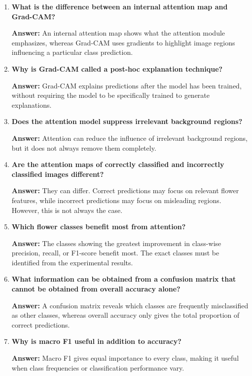 \documentclass[10pt]{article}
\begin{document}
\begin{enumerate}
\item \textbf{What is the difference between an internal attention map and Grad-CAM?}

\textbf{Answer:} An internal attention map shows what the attention module emphasizes, whereas Grad-CAM uses gradients to highlight image regions influencing a particular class prediction.

\item \textbf{Why is Grad-CAM called a post-hoc explanation technique?}

\textbf{Answer:} Grad-CAM explains predictions after the model has been trained, without requiring the model to be specifically trained to generate explanations.

\item \textbf{Does the attention model suppress irrelevant background regions?}

\textbf{Answer:} Attention can reduce the influence of irrelevant background regions, but it does not always remove them completely.

\item \textbf{Are the attention maps of correctly classified and incorrectly classified images different?}

\textbf{Answer:} They can differ. Correct predictions may focus on relevant flower features, while incorrect predictions may focus on misleading regions. However, this is not always the case.

\item \textbf{Which flower classes benefit most from attention?}

\textbf{Answer:} The classes showing the greatest improvement in class-wise precision, recall, or F1-score benefit most. The exact classes must be identified from the experimental results.

\item \textbf{What information can be obtained from a confusion matrix that cannot be obtained from overall accuracy alone?}

\textbf{Answer:} A confusion matrix reveals which classes are frequently misclassified as other classes, whereas overall accuracy only gives the total proportion of correct predictions.

\item \textbf{Why is macro F1 useful in addition to accuracy?}

\textbf{Answer:} Macro F1 gives equal importance to every class, making it useful when class frequencies or classification performance vary.


\end{enumerate}
\end{document}
